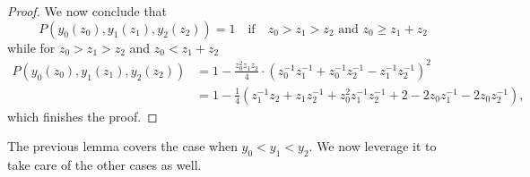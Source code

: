 \begin{proof}
We now conclude that
\[
	P(y_0(z_0), y_1(z_1), y_2(z_2)) = 1 \quad \text{if} \quad z_0 > z_1 > z_2 \text{ and } z_0 \geq z_1 + z_2
\]
while for $z_0 > z_1 > z_2$ and $z_0 < z_1 + z_2$
\begin{align*}
	P(y_0(z_0), y_1(z_1), y_2(z_2)) 
	&= 1 - \frac{z_0^2z_1z_2}{4} \cdot \left( z_0^{-1}z_1^{-1}+z_0^{-1}z_2^{-1}-z_1^{-1}z_2^{-1} \right)^2 \\
	&= 1 - \frac{1}{4} \left( z_1^{-1}z_2 + z_1z_2^{-1} + z_0^2z_1^{-1}z_2^{-1} + 2 - 2z_0z_1^{-1}-2z_0z_2^{-1}\right),
\end{align*}
which finishes the proof.
\end{proof}

The previous lemma covers the case when $y_0<y_1<y_2$. We now leverage it to take care of the other cases as well. 

